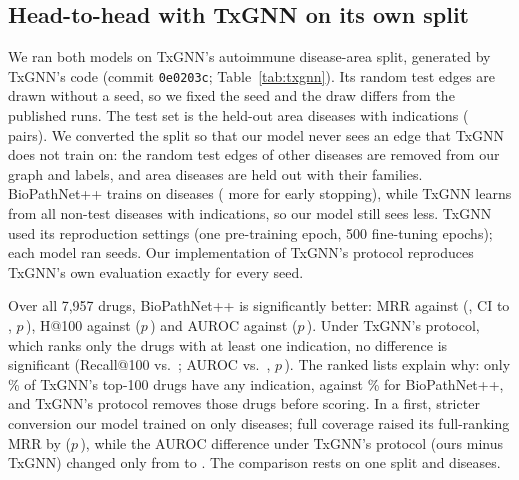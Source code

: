 \documentclass{ieeeaccess}
\newcommand{\sysname}{BioPathNet++\xspace}
\begin{document}
\subsection{Head-to-head with TxGNN on its own split}
\label{sec:txgnn}
We ran both models on TxGNN's autoimmune disease-area split, generated by TxGNN's code (commit \texttt{0e0203c}; Table~\ref{tab:txgnn}). Its random test edges are drawn without a seed, so we fixed the seed and the draw differs from the published runs. The test set is the \TxhN{} held-out area diseases with indications (\TxhPairs{} pairs). We converted the split so that our model never sees an edge that TxGNN does not train on: the \TxhDroppedEdges{} random test edges of \TxhDroppedDis{} other diseases are removed from our graph and labels, and area diseases are held out with their families. \sysname trains on \TxhTrainDis{} diseases (\TxhValidDis{} more for early stopping), while TxGNN learns from all \TxhNonTestDis{} non-test diseases with indications, so our model still sees less. TxGNN used its reproduction settings (one pre-training epoch, 500 fine-tuning epochs); each model ran \TxhSeedsTx{} seeds. Our implementation of TxGNN's protocol reproduces TxGNN's own evaluation exactly for every seed.

Over all 7,957 drugs, \sysname is significantly better: MRR \TxhOursMrr{} against \TxhTxMrr{} (\TxhDiffFullMrr, CI \TxhDiffLoFullMrr{} to \TxhDiffHiFullMrr, $p$\,\TxhPwilFullMrr), H@100 \TxhOursHitsHund{} against \TxhTxHitsHund{} ($p$\,\TxhPwilFullHitsHund) and AUROC \TxhOursFullAuroc{} against \TxhTxFullAuroc{} ($p$\,\TxhPwilFullAuroc). Under TxGNN's protocol, which ranks only the \TxhCand{} drugs with at least one indication, no difference is significant (Recall@100 \TxhOursRecall{} vs.\ \TxhTxRecall; AUROC \TxhOursAuroc{} vs.\ \TxhTxAuroc, $p$\,\TxhPwilAuroc). The ranked lists explain why: only \TxhTxIndShare\% of TxGNN's top-100 drugs have any indication, against \TxhOursIndShare\% for \sysname, and TxGNN's protocol removes those drugs before scoring. In a first, stricter conversion our model trained on only \TxhStrictTrainDis{} diseases; full coverage raised its full-ranking MRR by \TxhCovDiffFullMrr{} ($p$\,\TxhCovPwilFullMrr), while the AUROC difference under TxGNN's protocol (ours minus TxGNN) changed only from \TxhStrictDiffAuroc{} to \TxhDiffAuroc. The comparison rests on one split and \TxhN{} diseases.

\begin{table}[!t]
\centering
\caption{TxGNN's autoimmune split (\TxhN{} test diseases), means over seeds. TxGNN protocol: only drugs with $\geq$1 indication are ranked; full ranking: all 7,957 drugs. Lower block: first run with stricter coverage. Published row: TxGNN's repository (different draw).}
\label{tab:txgnn}
\footnotesize
\setlength{\tabcolsep}{5pt}

\end{table}
\end{document}
